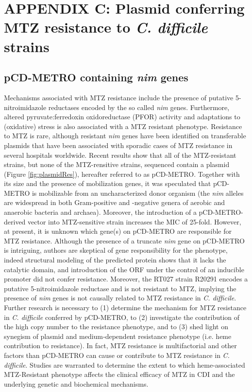 \documentclass{article}
\begin{document}
\section{APPENDIX C: Plasmid conferring MTZ resistance to {\it C. difficile} strains}

\subsection{pCD-METRO containing {\it nim} genes}

Mechanisms associated with MTZ resistance include the presence of putative 5-nitroimidazole reductases encoded by the so called {\it nim} genes. Furthermore, altered pyruvate:ferredoxin oxidoreductase (PFOR) activity and adaptations to (oxidative) stress is also associated with a  MTZ resistant phenotype. Resistance to MTZ is rare, although resistant {\it nim} genes have been identified on transferable plasmids that have been associated with sporadic cases of MTZ resistance in several hospitals worldwide. Recent results \cite{Boekhoud} show that all of the MTZ-resistant strains, but none of the MTZ-rensitive strains, sequenced contain a plasmid (Figure \ref{fig:plasmidRes}), hereafter referred to as pCD-METRO. Together with its size and the presence of mobilization genes, it was speculated that pCD-METRO is mobilizable from an uncharacterized donor organism (the {\it nim} alleles are widespread in both Gram-positive and -negative genera of aerobic and anaerobic bacteria and archaea). Moreover, the introduction of a pCD-METRO-derived vector into MTZ-sensitive strain increases the MIC of 25-fold. However, at present, it is unknown which gene(s) on pCD-METRO are responsible for MTZ resistance. Although the presence of a truncate {\it nim} gene on pCD-METRO is intriguing, \cite{Boekhoud} authors are skeptical of gene responsibility for the phenotype, indeed structural modeling of the predicted protein shows that it lacks the catalytic domain, and introduction of the ORF under the control of an inducible promoter did not confer resistance. Moreover, the RT027 strain R20291 encodes a putative 5-nitroimidazole reductase and is not resistant to MTZ, implying the presence of {\it nim} genes is not causally related to MTZ resistance in {\it C. difficile}. Further research is necessary to (1) determine the mechanism for MTZ resistance in {\it C. difficile} conferred by pCD-METRO, to (2) investigate the contribution of the high copy number to the resistance phenotype, and to (3) shed light on synegism of plasmid and medium‐dependent resistance phenotype (i.e. heme contribution to resistance). In fact, MTZ resistance is multifactorial and other factors than pCD-METRO can cause or contribute to MTZ resistance in {\it C. difficile}. Studies are warranted to determine the extent to which heme-associated MTZ-Resistant phenotype affects the clinical efficacy of MTZ in CDI and the underlying genetic and biochemical mechanisms.
\end{document}
